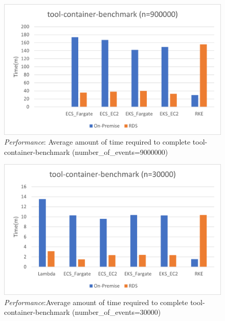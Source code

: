 \begin{figure}[hp]
  \includegraphics{images/perf-tcb_default.png}
  \caption{\emph{Performance}: Average amount of time required to complete tool-container-benchmark (number\_of\_events=9000000) }
  \label{fig:perf_tcb_default}
\end{figure}

\begin{figure}[hp]
  \includegraphics{images/perf-tcb_30000.png}
  \caption{\emph{Performance}:Average amount of time required to complete tool-container-benchmark (number\_of\_events=30000) }
  \label{fig:perf_tcb_30000}
\end{figure}

